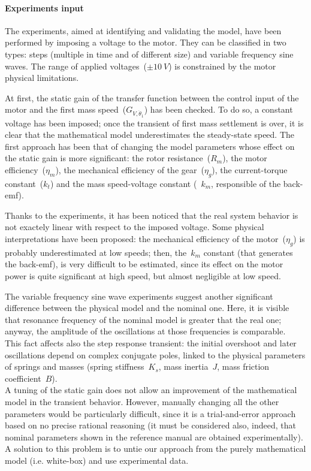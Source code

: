 \paragraph{Experiments input}
The experiments, aimed at identifying and validating the model, have been performed by imposing a voltage to the motor. They can be classified in two types: steps (multiple in time and of different size) and variable frequency sine waves. The range of applied voltages~($\pm 10\ V$) is constrained by the motor physical limitations.

At first, the static gain of the transfer function between the control input of the motor and the first mass speed~($G_{V,\dot{\theta}_1}$) has been checked. To do so, a constant voltage has been imposed; once the transient of first mass settlement is over, it is clear that the mathematical model underestimates the steady-state speed.
The first approach has been that of changing the model parameters whose effect on the static gain is more significant: the rotor resistance~($R_m$), the motor efficiency~($\eta_m$), the mechanical efficiency of the gear~($\eta_g$), the current-torque constant~($k_t$) and the mass speed-voltage constant (~$k_m$, responsible of the back-emf).

Thanks to the experiments, it has been noticed that the real system behavior is not exactely linear with respect to the imposed voltage. Some physical interpretations have been proposed: the mechanical efficiency of the motor~($\eta_g$) is probably underestimated at low speeds; then, the~$k_m$ constant (that generates the back-emf), is very difficult to be estimated, since its effect on the motor power is quite significant at high speed, but almost negligible at low speed.


The variable frequency sine wave experiments suggest another significant difference between the physical model and the nominal one. Here, it is visible that resonance frequency of the nominal model is greater that the real one; anyway, the amplitude of the oscillations at those frequencies is comparable. \\
This fact affects also the step response transient: the initial overshoot and later oscillations depend on complex conjugate poles, linked to the physical parameters of springs and masses (spring stiffness~$K_s$, mass inertia~$J$, mass friction coefficient~$B$). \\

A tuning of the static gain does not allow an improvement of the mathematical model in the transient behavior. However, manually changing all the other parameters would be particularly difficult, since it is a trial-and-error approach based on no precise rational reasoning (it must be considered also, indeed, that nominal parameters shown in the reference manual are obtained experimentally).
A solution to this problem is to untie our approach from the purely mathematical model (i.e. white-box) and use experimental data.

